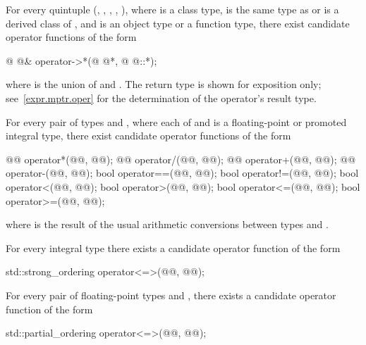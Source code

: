 \pnum
For every quintuple
(,
,
,
,
),
where
is a class type,
is the same type as  or is a derived class of , and
is an object type or a function type,
there exist candidate operator functions of the form
\begin{codeblock}
@ @& operator->*(@ @*, @ @::*);
\end{codeblock}
where  is the union of  and .
The return type is shown for exposition only; see~\ref{expr.mptr.oper} for the
determination of the operator's result type.

\pnum
For every pair of types  and ,
where each of  and  is a
floating-point or promoted integral type,
there exist candidate operator functions of the form
\begin{codeblock}
@@      operator*(@@, @@);
@@      operator/(@@, @@);
@@      operator+(@@, @@);
@@      operator-(@@, @@);
bool    operator==(@@, @@);
bool    operator!=(@@, @@);
bool    operator<(@@, @@);
bool    operator>(@@, @@);
bool    operator<=(@@, @@);
bool    operator>=(@@, @@);
\end{codeblock}
where
is the result of the usual arithmetic conversions between types
and
.

\pnum
For every integral type 
there exists a candidate operator function of the form
\begin{codeblock}
std::strong_ordering operator<=>(@@, @@);
\end{codeblock}

\pnum
For every pair of floating-point types
 and ,
there exists a candidate operator function of the form
\begin{codeblock}
std::partial_ordering operator<=>(@@, @@);
\end{codeblock}

